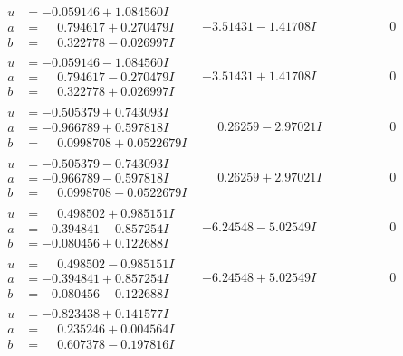\documentclass[1p]{elsarticle_modified}
\theoremstyle{definition}
\begin{document}
$$\begin{array}{c|c|c}
\begin{aligned}
u &= -0.059146 + 1.084560 I \\
a &= \phantom{-}0.794617 + 0.270479 I \\
b &= \phantom{-}0.322778 - 0.026997 I\end{aligned}
 & -3.51431 - 1.41708 I & \phantom{-0.000000 } 0 \\ \hline\begin{aligned}
u &= -0.059146 - 1.084560 I \\
a &= \phantom{-}0.794617 - 0.270479 I \\
b &= \phantom{-}0.322778 + 0.026997 I\end{aligned}
 & -3.51431 + 1.41708 I & \phantom{-0.000000 } 0 \\ \hline\begin{aligned}
u &= -0.505379 + 0.743093 I \\
a &= -0.966789 + 0.597818 I \\
b &= \phantom{-}0.0998708 + 0.0522679 I\end{aligned}
 & \phantom{-}0.26259 - 2.97021 I & \phantom{-0.000000 } 0 \\ \hline\begin{aligned}
u &= -0.505379 - 0.743093 I \\
a &= -0.966789 - 0.597818 I \\
b &= \phantom{-}0.0998708 - 0.0522679 I\end{aligned}
 & \phantom{-}0.26259 + 2.97021 I & \phantom{-0.000000 } 0 \\ \hline\begin{aligned}
u &= \phantom{-}0.498502 + 0.985151 I \\
a &= -0.394841 - 0.857254 I \\
b &= -0.080456 + 0.122688 I\end{aligned}
 & -6.24548 - 5.02549 I & \phantom{-0.000000 } 0 \\ \hline\begin{aligned}
u &= \phantom{-}0.498502 - 0.985151 I \\
a &= -0.394841 + 0.857254 I \\
b &= -0.080456 - 0.122688 I\end{aligned}
 & -6.24548 + 5.02549 I & \phantom{-0.000000 } 0 \\ \hline\begin{aligned}
u &= -0.823438 + 0.141577 I \\
a &= \phantom{-}0.235246 + 0.004564 I \\
b &= \phantom{-}0.607378 - 0.197816 I\end{aligned}

\end{array}$$
\end{document}
